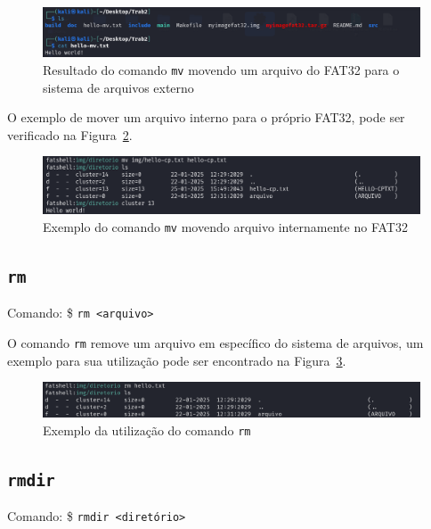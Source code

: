\documentclass[
    12pt,				%
    oneside,   	        %
    a4paper,			%
    english,			%
    french,				%
    spanish,			%
    brazil,				%
    ]{pacotes/abntex2}
\begin{document}
\begin{figure}[H]
    \centering
    \includegraphics[width=450pt]{figuras/resultados/14-mv-externo-validacao.PNG}
    \caption{Resultado do comando \texttt{mv} movendo um arquivo do FAT32 para o sistema de arquivos externo}
    \label{fig:mv-externo-validacao}
\end{figure}

O exemplo de mover um arquivo interno para o próprio FAT32, pode ser verificado na Figura~\ref{fig:mv-interno}.

\begin{figure}[H]
    \centering
    \includegraphics[width=450pt]{figuras/resultados/18-mv-interno-interno.PNG}
    \caption{Exemplo do comando \texttt{mv} movendo arquivo internamente no FAT32}
    \label{fig:mv-interno}
\end{figure}


\subsection{\texttt{rm}}
\label{subsec:rm}
Comando: \$ \texttt{rm <arquivo>}

O comando \texttt{rm} remove um arquivo em específico do sistema de arquivos, um exemplo para sua utilização pode ser encontrado na Figura~\ref{fig:rm}.

\begin{figure}[H]
    \centering
    \includegraphics[width=450pt]{figuras/resultados/16-rm.PNG}
    \caption{Exemplo da utilização do comando \texttt{rm}}
    \label{fig:rm}
\end{figure}


\subsection{\texttt{rmdir}}
\label{subsec:rmdir}
Comando: \$ \texttt{rmdir <diretório>}
\end{document}
